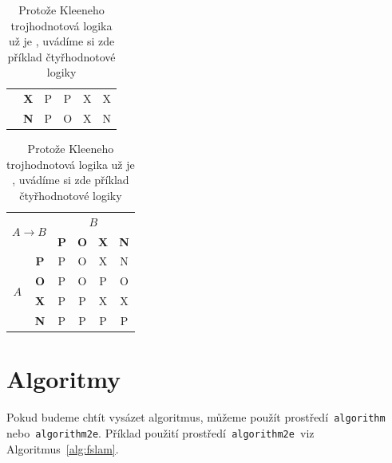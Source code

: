 \documentclass[a4paper, 11pt]{article}
\begin{document}
\begin{table}[h!]
\begin{tabular}{|c|c|c|c|c|c|}
		                                                  & \textbf{X}               & P          & P          & X          & X  \\ \cline{2-6}
		                                                  & \textbf{N}               & P          & O          & X          & N  \\ \cline{2-6}
		\hline
	\end{tabular}
	\begin{tabular}{|c|c|c|c|c|c|}
		\hline
		\multicolumn{2}{|c|}{\multirow{2}{*}{$A \rightarrow B$}} & \multicolumn{4}{c|}{$B$}                                             \\\cline{3-6}
		\multicolumn{2}{|c|}{ }                                  & \textbf{P}               & \textbf{O} & \textbf{X} & \textbf{N}      \\
		\hline
		\multirow{4}{*}{$A$}
		                                                         & \textbf{P}               & P          & O          & X          & N  \\ \cline{2-6}
		                                                         & \textbf{O}               & P          & O          & P          & O  \\ \cline{2-6}
		                                                         & \textbf{X}               & P          & P          & X          & X  \\ \cline{2-6}
		                                                         & \textbf{N}               & P          & P          & P          & P  \\ \cline{2-6}
		\hline
	\end{tabular}

	\caption{Protože Kleeneho trojhodnotová logika už je ,
		uvádíme si zde příklad čtyřhodnotové logiky}
	\label{tab:log}

\end{table}
\bigskip


\pagebreak

\section{Algoritmy}

Pokud budeme chtít vysázet algoritmus, můžeme použít
prostředí\texttt{ algorithm\footnotemark[2] }
nebo\texttt{ algorithm2e\footnotemark[3]}. Příklad použití
prostředí\texttt{ algorithm2e }viz Algoritmus~\ref{alg:fslam}.
\end{document}
